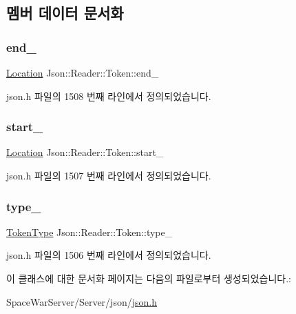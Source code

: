 \subsection{멤버 데이터 문서화}
\mbox{\label{class_json_1_1_reader_1_1_token_a7d3bc0fa40097f435d184be4b1fd5ae1}} 
\subsubsection{\texorpdfstring{end\+\_\+}{end\_}}
{\footnotesize\ttfamily \hyperlink{class_json_1_1_reader_a46795b5b272bf79a7730e406cb96375a}{Location} Json\+::\+Reader\+::\+Token\+::end\+\_\+}



json.\+h 파일의 1508 번째 라인에서 정의되었습니다.

\mbox{\label{class_json_1_1_reader_1_1_token_aff87d677b9ac4b52542a00b0d6673249}} 
\subsubsection{\texorpdfstring{start\+\_\+}{start\_}}
{\footnotesize\ttfamily \hyperlink{class_json_1_1_reader_a46795b5b272bf79a7730e406cb96375a}{Location} Json\+::\+Reader\+::\+Token\+::start\+\_\+}



json.\+h 파일의 1507 번째 라인에서 정의되었습니다.

\mbox{\label{class_json_1_1_reader_1_1_token_aa0f06d0105ec3d8cb42427c66b991bad}} 
\subsubsection{\texorpdfstring{type\+\_\+}{type\_}}
{\footnotesize\ttfamily \hyperlink{class_json_1_1_reader_aa35e6ab574dc399a0a645ad98ed66bc9}{Token\+Type} Json\+::\+Reader\+::\+Token\+::type\+\_\+}



json.\+h 파일의 1506 번째 라인에서 정의되었습니다.



이 클래스에 대한 문서화 페이지는 다음의 파일로부터 생성되었습니다.\+:\begin{DoxyCompactItemize}
\item 
Space\+War\+Server/\+Server/json/\hyperlink{json_8h}{json.\+h}\end{DoxyCompactItemize}
